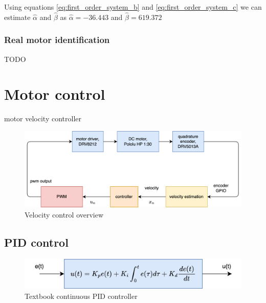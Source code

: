 \documentclass[12pt,twoside,onecolumn,openany,extrafontsizes,dvipsnames]{memoir}
\begin{document}
            Using equations \ref{eq:first_order_system_b} and \ref{eq:first_order_system_c} we can estimate $\hat{\alpha}$ and $\hat{\beta}$ as
            $\hat{\alpha} = -36.443$ and $\hat{\beta} = 619.372$

          

        \subsection{Real motor identification}
        TODO


\newpage
\chapter{Motor control}

    motor velocity controller

    \begin{figure}[!htb]
        \centering
        \includegraphics[scale=0.6]{../diagrams/control_generic/control_generic-motor_control.png}
        \caption{Velocity control overview}
        \label{fig:velocity_control_overview}
    \end{figure}


    \newpage
    \section{PID control}

        \begin{figure}[!htb]
            \centering
            \includegraphics[scale=0.8]{../diagrams/control_generic/control_generic-pid.png}
            \caption{Textbook continuous PID controller}
            \label{fig:textbook_continuous_pid_controller}
        \end{figure}
\end{document}
